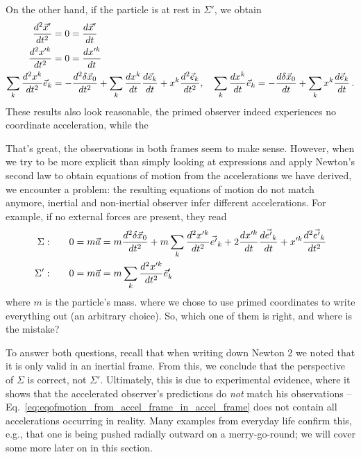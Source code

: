 \documentclass[../class_mech_main.tex]{subfiles}
\begin{document}
\begin{itemize}
	On the other hand, if the particle is at rest in $\Sigma'$, we obtain
	\begin{align*}
		\dv[2]{\vec{x}'}{t} &= 0 = \dv{\vec{x}'}{t}
		\\
		\dv[2]{x'^k}{t} &= 0 = \dv{x'^k}{t}
		\\
		\sum_k \dv[2]{x^k}{t} \vec{e}_k &= -\dv[2]{\delta \vec{x}_0}{t} + \sum_k \dv{x^k}{t} \dv{\vec{e}_k}{t} + x^k \dv[2]{\vec{e}_k}{t},
		\quad \sum_k \dv{x^k}{t} \vec{e}_k = -\dv{\delta \vec{x}_0}{t} + \sum_k x^k \dv{\vec{e}_k}{t} \, .
	\end{align*}
	These results also look reasonable, the primed observer indeed experiences no coordinate acceleration, while the
\end{itemize}

That's great, the observations in both frames seem to make sense. However, when we try to be more explicit than simply looking at expressions and apply Newton's second law to obtain equations of motion from the accelerations we have derived, we encounter a problem: the resulting equations of motion do not match anymore, inertial and non-inertial observer infer different accelerations. For example, if no external forces are present, they read
\begin{align}
	\Sigma: \qquad & 0 = m \vec{a} = m \dv[2]{\delta \vec{x}_0}{t} + m \sum_k \dv[2]{x'^k}{t} \vec{e'}_k + 2 \dv{x'^k}{t} \dv{\vec{e'}_k}{t} + x'^k \dv[2]{\vec{e'}_k}{t}
	\label{eq:eqofmotion_from_accel_frame_in_inert_frame}
	\\
	\Sigma': \qquad & 0 = m \vec{a} = m \sum_k \dv[2]{x'^k}{t} \vec{e}'_k
	\label{eq:eqofmotion_from_accel_frame_in_accel_frame}
\end{align}
where $m$ is the particle's mass.
where we chose to use primed coordinates to write everything out (an arbitrary choice). So, which one of them is right, and where is the mistake?


To answer both questions, recall that when writing down Newton 2 we noted that it is only valid in an inertial frame. From this, we conclude that the perspective of $\Sigma$ is correct, not $\Sigma'$. Ultimately, this is due to experimental evidence, where it shows that the accelerated observer's predictions do \emph{not} match his observations -- Eq.~\eqref{eq:eqofmotion_from_accel_frame_in_accel_frame} does not contain all accelerations occurring in reality. Many examples from everyday life confirm this, e.g., that one is being pushed radially outward on a merry-go-round; we will cover some more later on in this section.
\end{document}
